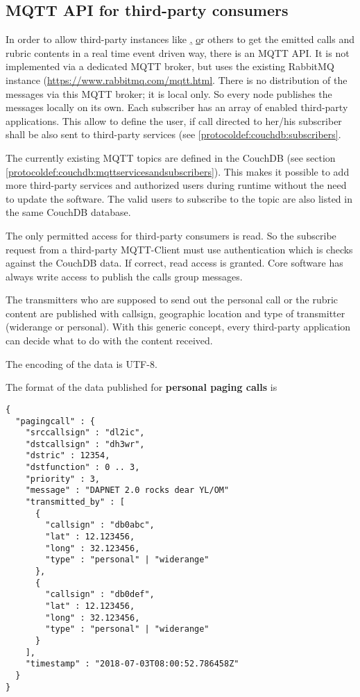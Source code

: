 \subsection{MQTT API for third-party consumers}
\label{protocoldef:mqttapi}
In order to allow third-party instances like \href{http://www.aprs-is.net/|APRS}, \href{http://brandmeister.network|Brandmeister} or others to get the emitted calls and rubric contents in a real time event driven way, there is an MQTT API. It is not implemented via a dedicated MQTT broker, but uses the existing RabbitMQ instance (\url{https://www.rabbitmq.com/mqtt.html}. There is no distribution of the messages via this MQTT broker; it is local only. So every node publishes the messages locally on its own.
Each subscriber has an array of enabled third-party applications. This allow to define the user, if call directed to her/his subscriber shall be also sent to third-party services (see \ref{protocoldef:couchdb:subscribers}.

The currently existing MQTT topics are defined in the CouchDB (see section \ref{protocoldef:couchdb:mqttservicesandsubscribers}). This makes it possible to add more third-party services and authorized users during runtime without the need to update the software.
The valid users to subscribe to the topic are also listed in the same CouchDB database.

The only permitted access for third-party consumers is read. So the subscribe request from a third-party MQTT-Client must use authentication which is checks against the CouchDB data. If correct, read access is granted. Core software has always write access to publish the calls group messages.

The transmitters who are supposed to send out the personal call or the rubric content are published with callsign, geographic location and type of transmitter (widerange or personal). With this generic concept, every third-party application can decide what to do with the content received.

The encoding of the data is UTF-8.

The format of the data published for \textbf{personal paging calls} is
\begin{lstlisting}
{
  "pagingcall" : {
    "srccallsign" : "dl2ic",
    "dstcallsign" : "dh3wr",
    "dstric" : 12354,
    "dstfunction" : 0 .. 3,
    "priority" : 3,
    "message" : "DAPNET 2.0 rocks dear YL/OM"
    "transmitted_by" : [
      {
        "callsign" : "db0abc",
        "lat" : 12.123456,
        "long" : 32.123456,
        "type" : "personal" | "widerange"
      },
      {
        "callsign" : "db0def",
        "lat" : 12.123456,
        "long" : 32.123456,
        "type" : "personal" | "widerange"
      }
    ],
    "timestamp" : "2018-07-03T08:00:52.786458Z"
  }
}
\end{lstlisting}

